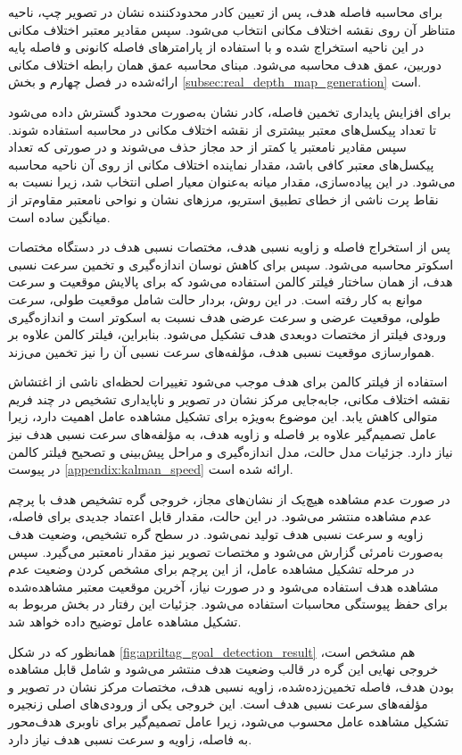 برای محاسبه فاصله هدف، پس از تعیین کادر محدودکننده نشان در تصویر چپ، ناحیه متناظر آن روی نقشه اختلاف مکانی انتخاب می‌شود. سپس مقادیر معتبر اختلاف مکانی در این ناحیه استخراج شده و با استفاده از پارامترهای فاصله کانونی و فاصله پایه دوربین، عمق هدف محاسبه می‌شود. مبنای محاسبه عمق همان رابطه اختلاف مکانی ارائه‌شده در فصل چهارم و بخش \ref{subsec:real_depth_map_generation} است.

برای افزایش پایداری تخمین فاصله، کادر نشان به‌صورت محدود گسترش داده می‌شود تا تعداد پیکسل‌های معتبر بیشتری از نقشه اختلاف مکانی در محاسبه استفاده شوند. سپس مقادیر نامعتبر یا کمتر از حد مجاز حذف می‌شوند و در صورتی که تعداد پیکسل‌های معتبر کافی باشد، مقدار نماینده اختلاف مکانی از روی آن ناحیه محاسبه می‌شود. در این پیاده‌سازی، مقدار میانه به‌عنوان معیار اصلی انتخاب شد، زیرا نسبت به نقاط پرت ناشی از خطای تطبیق استریو، مرزهای نشان و نواحی نامعتبر مقاوم‌تر از میانگین ساده است.

پس از استخراج فاصله و زاویه نسبی هدف، مختصات نسبی هدف در دستگاه مختصات اسکوتر محاسبه می‌شود. سپس برای کاهش نوسان اندازه‌گیری و تخمین سرعت نسبی هدف، از همان ساختار فیلتر کالمن استفاده می‌شود که برای پالایش موقعیت و سرعت موانع به کار رفته است. در این روش، بردار حالت شامل موقعیت طولی، سرعت طولی، موقعیت عرضی و سرعت عرضی هدف نسبت به اسکوتر است و اندازه‌گیری ورودی فیلتر از مختصات دوبعدی هدف تشکیل می‌شود. بنابراین، فیلتر کالمن علاوه بر هموارسازی موقعیت نسبی هدف، مؤلفه‌های سرعت نسبی آن را نیز تخمین می‌زند.

استفاده از فیلتر کالمن برای هدف موجب می‌شود تغییرات لحظه‌ای ناشی از اغتشاش نقشه اختلاف مکانی، جابه‌جایی مرکز نشان در تصویر و ناپایداری تشخیص در چند فریم متوالی کاهش یابد. این موضوع به‌ویژه برای تشکیل مشاهده عامل اهمیت دارد، زیرا عامل تصمیم‌گیر علاوه بر فاصله و زاویه هدف، به مؤلفه‌های سرعت نسبی هدف نیز نیاز دارد. جزئیات مدل حالت، مدل اندازه‌گیری و مراحل پیش‌بینی و تصحیح فیلتر کالمن در پیوست \ref{appendix:kalman_speed} ارائه شده است.

در صورت عدم مشاهده هیچ‌یک از نشان‌های مجاز، خروجی گره تشخیص هدف با پرچم عدم مشاهده منتشر می‌شود. در این حالت، مقدار قابل اعتماد جدیدی برای فاصله، زاویه و سرعت نسبی هدف تولید نمی‌شود. در سطح گره تشخیص، وضعیت هدف به‌صورت نامرئی گزارش می‌شود و مختصات تصویر نیز مقدار نامعتبر می‌گیرد. سپس در مرحله تشکیل مشاهده عامل، از این پرچم برای مشخص کردن وضعیت عدم مشاهده هدف استفاده می‌شود و در صورت نیاز، آخرین موقعیت معتبر مشاهده‌شده برای حفظ پیوستگی محاسبات استفاده می‌شود. جزئیات این رفتار در بخش مربوط به تشکیل مشاهده عامل توضیح داده خواهد شد.

همانظور که در شکل \ref{fig:apriltag_goal_detection_result} هم مشخص است، خروجی نهایی این گره در قالب وضعیت هدف منتشر می‌شود و شامل قابل مشاهده بودن هدف، فاصله تخمین‌زده‌شده، زاویه نسبی هدف، مختصات مرکز نشان در تصویر و مؤلفه‌های سرعت نسبی هدف است. این خروجی یکی از ورودی‌های اصلی زنجیره تشکیل مشاهده عامل محسوب می‌شود، زیرا عامل تصمیم‌گیر برای ناوبری هدف‌محور به فاصله، زاویه و سرعت نسبی هدف نیاز دارد.

